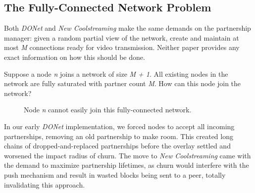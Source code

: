 \documentclass[12pt,a4paper]{article}
\begin{document}
\subsection{The Fully-Connected Network Problem} \label{problems:fcn}
Both \textit{DONet} and \textit{New Coolstreaming} make the same demands on the partnership manager: given a random partial view of the network, create and maintain at most \textit{M} connections ready for video transmission. Neither paper provides any exact information on how this should be done.

Suppose a node \textit{n} joins a network of size \textit{M + 1}. All existing nodes in the network are fully saturated with partner count \textit{M}. How can this node join the network?

\begin{figure}[!ht]
	\centering
	\caption{Node \textit{n} cannot easily join this fully-connected network.}
	\label{fig1}
\end{figure}

In our early \textit{DONet} implementation, we forced nodes to accept all incoming partnerships, removing an old partnership to make room. This created long chains of dropped-and-replaced partnerships before the overlay settled and worsened the impact radius of churn. The move to \textit{New Coolstreaming} came with the demand to maximize partnership lifetimes, as churn would interfere with the push mechanism and result in wasted blocks being sent to a peer, totally invalidating this approach.
\end{document}
